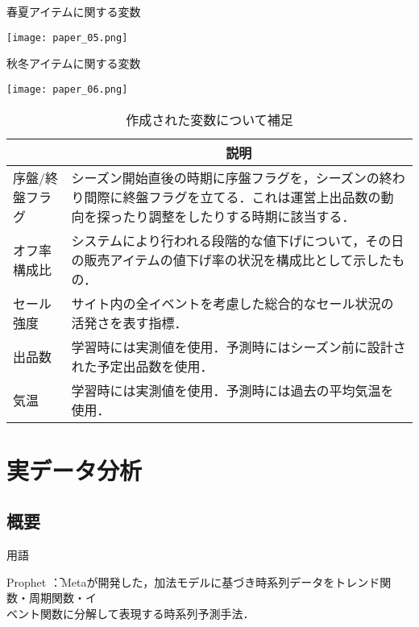\documentclass[dvipdfmx]{jreport}
\begin{document}
\begin{table}[h]
    \centering
    \begin{minipage}[b]{0.49\columnwidth}
        \centering
        \caption{春夏アイテムに関する変数}\label{tab:02}
        \texttt{[image: paper\_05.png]} 
    \end{minipage}
    \centering
    \begin{minipage}[b]{0.49\columnwidth}
        \centering
        \caption{秋冬アイテムに関する変数}\label{tab:03}
        \texttt{[image: paper\_06.png]}
    \end{minipage}
\end{table}


\begin{table}[h]
    \centering
    \caption{作成された変数について補足}\label{tab:04}
    \begin{tabular}{|p{}|p{}|} \hline
        \rowcolor{gray!20} %
        \multicolumn{1}{|c|}{\textbf{変数}} & \multicolumn{1}{c|}{\textbf{説明}} \\ \hline \hline
        序盤/終盤フラグ & シーズン開始直後の時期に序盤フラグを，シーズンの終わり間際に終盤フラグを立てる．これは運営上出品数の動向を探ったり調整をしたりする時期に該当する． \\ \hline
        オフ率構成比 & システムにより行われる段階的な値下げについて，その日の販売アイテムの値下げ率の状況を構成比として示したもの．\\ \hline
        セール強度 & サイト内の全イベントを考慮した総合的なセール状況の活発さを表す指標． \\ \hline
        出品数 & 学習時には実測値を使用．予測時にはシーズン前に設計された予定出品数を使用．\\ \hline
        気温 & 学習時には実測値を使用．予測時には過去の平均気温を使用．\\ \hline
    \end{tabular}
\end{table}


\newpage
\section{実データ分析}\label{実データ分析}
\subsection{概要}
\begin{itembox}[l]{\large{用語}}
    \begin{tabbing}
        \hspace{15pt} \raisebox{0.5ex}{\tiny $\bullet$} Prophet \hspace{1pt}\=：Metaが開発した，加法モデルに基づき時系列データをトレンド関数・周期関数・イ\\[0.5em]\>\hspace{6.5pt}ベント関数に分解して表現する時系列予測手法．
    \end{tabbing}
\end{itembox}
\end{document}
